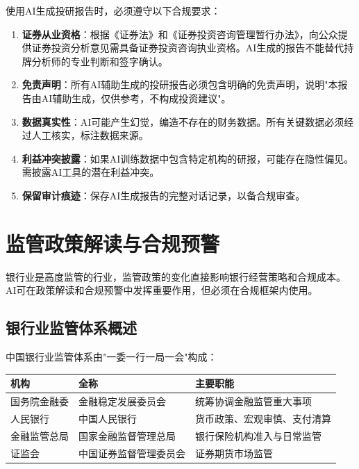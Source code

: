 \begin{warningbox}[投研报告的合规要求]
使用AI生成投研报告时，必须遵守以下合规要求：

\begin{enumerate}[leftmargin=2em]
  \item \textbf{证券从业资格}：根据《证券法》和《证券投资咨询管理暂行办法》，向公众提供证券投资分析意见需具备证券投资咨询执业资格。AI生成的报告不能替代持牌分析师的专业判断和签字确认。

  \item \textbf{免责声明}：所有AI辅助生成的投研报告必须包含明确的免责声明，说明"本报告由AI辅助生成，仅供参考，不构成投资建议"。

  \item \textbf{数据真实性}：AI可能产生幻觉，编造不存在的财务数据。所有关键数据必须经过人工核实，标注数据来源。

  \item \textbf{利益冲突披露}：如果AI训练数据中包含特定机构的研报，可能存在隐性偏见。需披露AI工具的潜在利益冲突。

  \item \textbf{保留审计痕迹}：保存AI生成报告的完整对话记录，以备合规审查。
\end{enumerate}
\end{warningbox}

\section{监管政策解读与合规预警}

银行业是高度监管的行业，监管政策的变化直接影响银行经营策略和合规成本。AI可在政策解读和合规预警中发挥重要作用，但必须在合规框架内使用。

\subsection{银行业监管体系概述}

中国银行业监管体系由"一委一行一局一会"构成：

\begin{table}[H]
\centering
\begin{tabular}{llp{5cm}}
\toprule
\textbf{机构} & \textbf{全称} & \textbf{主要职能} \\
\midrule
国务院金融委 & 金融稳定发展委员会 & 统筹协调金融监管重大事项 \\
人民银行 & 中国人民银行 & 货币政策、宏观审慎、支付清算 \\
金融监管总局 & 国家金融监督管理总局 & 银行保险机构准入与日常监管 \\
证监会 & 中国证券监督管理委员会 & 证券期货市场监管 \\
\bottomrule
\end{tabular}
\end{table}

